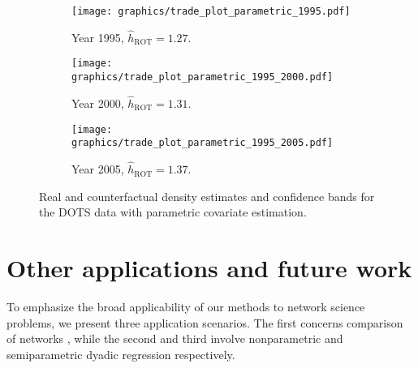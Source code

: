 \documentclass[11pt,lof]{puthesis}
\DeclareMathOperator{\ROT}{ROT}
\theoremstyle{break}
\theoremstyle{proof}
\begin{document}
\begin{figure}[t]
\centering
%
\begin{subfigure}{0.32\textwidth}
\centering
\texttt{[image: graphics/trade\_plot\_parametric\_1995.pdf]}
\caption{Year 1995, $\hat h_{\ROT} = 1.27$.}
\end{subfigure}
%
\begin{subfigure}{0.32\textwidth}
\centering
\texttt{[image: graphics/trade\_plot\_parametric\_1995\_2000.pdf]}
\caption{Year 2000, $\hat h_{\ROT} = 1.31$.}
\end{subfigure}
%
\begin{subfigure}{0.32\textwidth}
\centering
\texttt{[image: graphics/trade\_plot\_parametric\_1995\_2005.pdf]}
\caption{Year 2005, $\hat h_{\ROT} = 1.37$.}
\end{subfigure}
%
\caption[Parametric likelihood-based estimation and
inference for the DOTS data]{
Real and counterfactual density estimates and confidence bands for
the DOTS data with parametric covariate estimation.}
%
\label{fig:kernel_trade_para}
%
\end{figure}

\section{Other applications and future work}
\label{sec:kernel_future}

To emphasize the broad applicability of our methods to network science
problems, we present three application scenarios. The first concerns comparison
of networks \citep{kolaczyk2009statistical}, while the second and third involve
nonparametric and semiparametric dyadic regression respectively.
\end{document}
